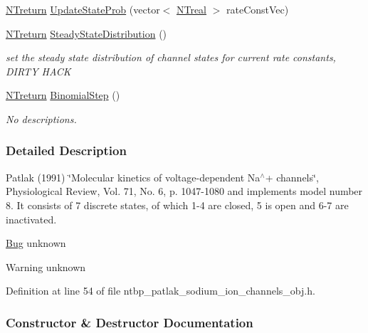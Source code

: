 \begin{DoxyCompactItemize}
\hyperlink{nt__types_8h_ab9564ee8f091e809d21b8451c6683c53}{NTreturn} \hyperlink{class_n_t_b_p__patlak__sodium__ion__channels__o_ad3ab2a983cdc7acb49acc91f217d1527}{UpdateStateProb} (vector$<$ \hyperlink{nt__types_8h_a814a97893e9deb1eedcc7604529ba80d}{NTreal} $>$ rateConstVec)
\item 
\hyperlink{nt__types_8h_ab9564ee8f091e809d21b8451c6683c53}{NTreturn} \hyperlink{class_n_t_b_p__patlak__sodium__ion__channels__o_ab45b8f8da67ca2f7e168258641cae478}{SteadyStateDistribution} ()
\begin{DoxyCompactList}\small\item\em set the steady state distribution of channel states for current rate constants, DIRTY HACK \item\end{DoxyCompactList}\item 
\hyperlink{nt__types_8h_ab9564ee8f091e809d21b8451c6683c53}{NTreturn} \hyperlink{class_n_t_b_p__patlak__sodium__ion__channels__o_a3d572d7973c668f2daf24d974562b6fd}{BinomialStep} ()
\begin{DoxyCompactList}\small\item\em No descriptions. \item\end{DoxyCompactList}\end{DoxyCompactItemize}


\subsubsection{Detailed Description}
Patlak (1991) \char`\"{}Molecular kinetics of voltage-\/dependent Na$^\wedge$+ channels\char`\"{}, Physiological Review, Vol. 71, No. 6, p. 1047-\/1080 and implements model number 8. It consists of 7 discrete states, of which 1-\/4 are closed, 5 is open and 6-\/7 are inactivated. \begin{Desc}
\item[\hyperlink{bug__bug000074}{Bug}]unknown \end{Desc}
\begin{DoxyWarning}{Warning}
unknown 
\end{DoxyWarning}


Definition at line 54 of file ntbp\_\-patlak\_\-sodium\_\-ion\_\-channels\_\-obj.h.



\subsubsection{Constructor \& Destructor Documentation}
